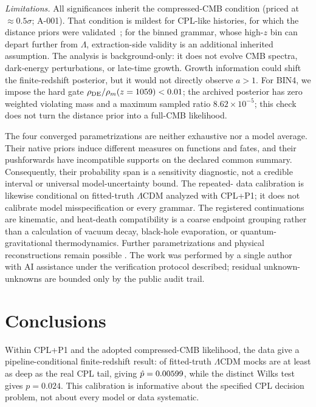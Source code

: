 \documentclass[a4paper,11pt]{article}
\newcommand{\lcdm}{\ensuremath{\Lambda\mathrm{CDM}}}
\begin{document}
\emph{Limitations.} All significances inherit the compressed-CMB condition
(priced at $\approx0.5\sigma$; A-001). That condition is mildest for
CPL-like histories, for which the distance priors were
validated~\cite{ChenHuangWang2018}; for the binned grammar, whose
high-$z$ bin can depart further from $\Lambda$, extraction-side validity
is an additional inherited assumption. The analysis is background-only: it
does not evolve CMB spectra, dark-energy perturbations, or late-time growth.
Growth information could shift the finite-redshift posterior, but it would not
directly observe $a>1$. For BIN4, we impose the hard gate
$\rho_{\rm DE}/\rho_m(z=1059)<0.01$; the archived posterior has zero weighted
violating mass and a maximum sampled ratio $8.62\times10^{-5}$; this check does
not turn the distance prior into a full-CMB likelihood.

The four converged parametrizations are neither exhaustive nor a model
average. Their native priors induce different measures on functions and fates,
and their pushforwards have incompatible supports on the declared common
summary. Consequently, their probability span is a sensitivity diagnostic,
not a credible interval or universal model-uncertainty bound. The repeated-
data calibration is likewise conditional on fitted-truth \lcdm{} analyzed
with CPL+P1; it does not calibrate model misspecification or every grammar.
The registered continuations are kinematic, and heat-death compatibility is a
coarse endpoint grouping rather than a calculation of vacuum decay, black-hole
evaporation, or quantum-gravitational thermodynamics. Further
parametrizations and physical reconstructions remain possible
\cite{Wolf2025}. The work was performed by a single author with AI assistance
under the verification protocol described; residual unknown-unknowns are
bounded only by the public audit trail.

\section{Conclusions}\label{sec:conclusions}

Within CPL+P1 and the adopted compressed-CMB likelihood, the data give a
pipeline-conditional finite-redshift result: \NullFiveK{} of \NullFiveN{}
fitted-truth \lcdm{} mocks are at least as deep as the real CPL tail, giving
$\hat p=0.00599$, while the distinct Wilks test gives $p=0.024$.
This calibration is informative about the specified CPL decision problem, not
about every model or data systematic.
\end{document}
